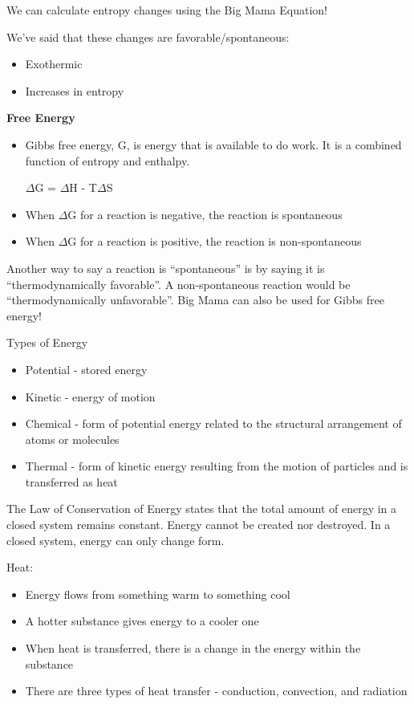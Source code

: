 \documentclass[../hchem.tex]{subfiles}
\begin{document}
We can calculate entropy changes using the Big Mama Equation!

We've said that these changes are favorable/spontaneous:
\begin{itemize}
    \item Exothermic 
    \item Increases in entropy 
\end{itemize}

\textbf{Free Energy}
\begin{itemize}
    \item Gibbs free energy, G, is energy that is available to do work. It is a combined function of entropy and enthalpy.
    \begin{center}
        $\Delta$G = $\Delta$H - T$\Delta$S 
    \end{center}
    \item When $\Delta$G for a reaction is negative, the reaction is spontaneous
    \item When $\Delta$G for a reaction is positive, the reaction is non-spontaneous
\end{itemize}

Another way to say a reaction is ``spontaneous'' is by saying it is ``thermodynamically favorable''. A non-spontaneous reaction would be 
``thermodynamically unfavorable''. Big Mama can also be used for Gibbs free energy!

Types of Energy 
\begin{itemize}
    \item Potential - stored energy 
    \item Kinetic - energy of motion 
    \item Chemical - form of potential energy related to the structural arrangement of atoms or molecules 
    \item Thermal - form of kinetic energy resulting from the motion of particles and is transferred as heat 
\end{itemize}

The Law of Conservation of Energy states that the total amount of energy in a closed system remains constant. Energy cannot be created nor destroyed.
In a closed system, energy can only change form.

Heat:
\begin{itemize}
    \item Energy flows from something warm to something cool 
    \item A hotter substance gives energy to a cooler one 
    \item When heat is transferred, there is a change in the energy within the substance 
    \item There are three types of heat transfer - conduction, convection, and radiation 
\end{itemize}
\end{document}

